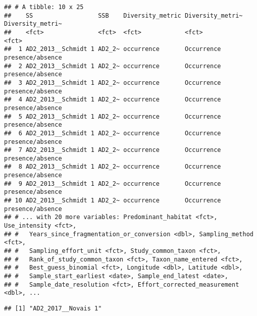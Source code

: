 \documentclass[
]{article}
\newenvironment{Shaded}{\begin{snugshade}}{\end{snugshade}}
\newcommand{\DecValTok}[1]{\textcolor[rgb]{0.00,0.00,0.81}{#1}}
\newcommand{\FunctionTok}[1]{\textcolor[rgb]{0.00,0.00,0.00}{#1}}
\newcommand{\NormalTok}[1]{#1}
\newcommand{\SpecialCharTok}[1]{\textcolor[rgb]{0.00,0.00,0.00}{#1}}
\begin{document}
\begin{verbatim}
## # A tibble: 10 x 25
##    SS                  SSB    Diversity_metric Diversity_metri~ Diversity_metri~
##    <fct>               <fct>  <fct>            <fct>            <fct>           
##  1 AD2_2013__Schmidt 1 AD2_2~ occurrence       Occurrence       presence/absence
##  2 AD2_2013__Schmidt 1 AD2_2~ occurrence       Occurrence       presence/absence
##  3 AD2_2013__Schmidt 1 AD2_2~ occurrence       Occurrence       presence/absence
##  4 AD2_2013__Schmidt 1 AD2_2~ occurrence       Occurrence       presence/absence
##  5 AD2_2013__Schmidt 1 AD2_2~ occurrence       Occurrence       presence/absence
##  6 AD2_2013__Schmidt 1 AD2_2~ occurrence       Occurrence       presence/absence
##  7 AD2_2013__Schmidt 1 AD2_2~ occurrence       Occurrence       presence/absence
##  8 AD2_2013__Schmidt 1 AD2_2~ occurrence       Occurrence       presence/absence
##  9 AD2_2013__Schmidt 1 AD2_2~ occurrence       Occurrence       presence/absence
## 10 AD2_2013__Schmidt 1 AD2_2~ occurrence       Occurrence       presence/absence
## # ... with 20 more variables: Predominant_habitat <fct>, Use_intensity <fct>,
## #   Years_since_fragmentation_or_conversion <dbl>, Sampling_method <fct>,
## #   Sampling_effort_unit <fct>, Study_common_taxon <fct>,
## #   Rank_of_study_common_taxon <fct>, Taxon_name_entered <fct>,
## #   Best_guess_binomial <fct>, Longitude <dbl>, Latitude <dbl>,
## #   Sample_start_earliest <date>, Sample_end_latest <date>,
## #   Sample_date_resolution <fct>, Effort_corrected_measurement <dbl>, ...
\end{verbatim}

\begin{Shaded}
\end{Shaded}

\begin{verbatim}
## [1] "AD2_2017__Novais 1"
\end{verbatim}
\end{document}
